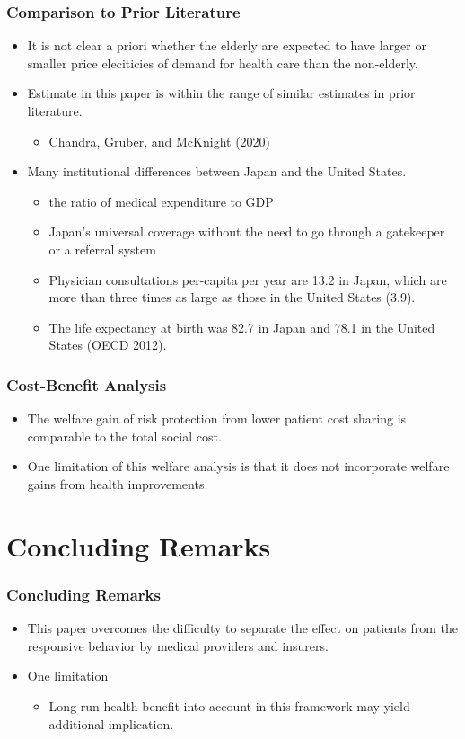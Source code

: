 \documentclass[dvipdfmx,11pt]{beamer}
\begin{document}
\begin{frame}\frametitle{Comparison to Prior Literature}
  \begin{itemize}
    \item It is not clear a priori whether the elderly are expected to have larger or smaller price eleciticies of demand for health care than the non-elderly.
    \item Estimate in this paper is within the range of similar estimates in prior literature.
    \begin{itemize}
      \item Chandra, Gruber, and McKnight (2020)
    \end{itemize}
    \item Many institutional differences between Japan and the United States.
    \begin{itemize}
      \item the ratio of medical expenditure to GDP
      \item Japan’s universal coverage without the need to go through a gatekeeper or a referral system
      \item Physician consultations per-capita per year are 13.2 in Japan, which are more than three times as large as those in the United States (3.9).
      \item The life expectancy at birth was 82.7 in Japan and 78.1 in the United States (OECD 2012).
    \end{itemize}
  \end{itemize}
\end{frame}

\begin{frame}\frametitle{Cost-Benefit Analysis}
  \begin{itemize}
    \item The welfare gain of risk protection from lower patient cost sharing is comparable to the total social cost.
    \item One limitation of this welfare analysis is that it does not incorporate welfare gains from health improvements.
  \end{itemize}
\end{frame}

\section{Concluding Remarks}
\frame{\sectionpage}

\begin{frame}\frametitle{Concluding Remarks}
  \begin{itemize}
    \item This paper overcomes the difficulty to separate the effect on patients from the responsive behavior by medical providers and insurers.
    \item One limitation
    \begin{itemize}
      \item Long-run health benefit into account in this framework may yield additional implication.
    \end{itemize}
  \end{itemize}
\end{frame}
\end{document}
